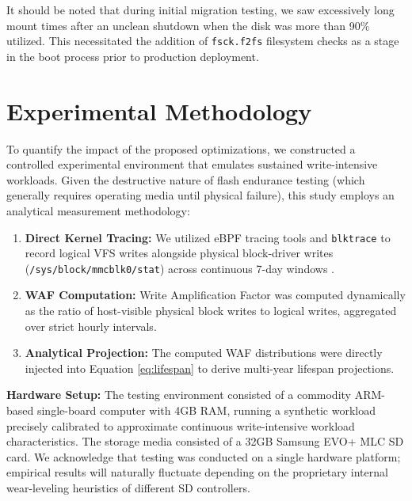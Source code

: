 \documentclass[conference]{IEEEtran}
\begin{document}
It should be noted that during initial migration testing, we saw excessively long mount times after an unclean shutdown when the disk was more than 90\% utilized. This necessitated the addition of \texttt{fsck.f2fs} filesystem checks as a stage in the boot process prior to production deployment.

\section{Experimental Methodology}

To quantify the impact of the proposed optimizations, we constructed a controlled experimental environment that emulates sustained write-intensive workloads. Given the destructive nature of flash endurance testing (which generally requires operating media until physical failure), this study employs an analytical measurement methodology:
\begin{enumerate}
    \item \textbf{Direct Kernel Tracing:} We utilized eBPF tracing tools \cite{b23} and \texttt{blktrace} to record logical VFS writes alongside physical block-driver writes (\texttt{/sys/block/mmcblk0/stat}) across continuous 7-day windows \cite{b24}.
    \item \textbf{WAF Computation:} Write Amplification Factor was computed dynamically as the ratio of host-visible physical block writes to logical writes, aggregated over strict hourly intervals.
    \item \textbf{Analytical Projection:} The computed WAF distributions were directly injected into Equation \ref{eq:lifespan} to derive multi-year lifespan projections.
\end{enumerate}

\textbf{Hardware Setup:} The testing environment consisted of a commodity ARM-based single-board computer with 4GB RAM, running a synthetic workload precisely calibrated to approximate continuous write-intensive workload characteristics. The storage media consisted of a 32GB Samsung EVO+ MLC SD card. We acknowledge that testing was conducted on a single hardware platform; empirical results will naturally fluctuate depending on the proprietary internal wear-leveling heuristics of different SD controllers.

\end{document}
